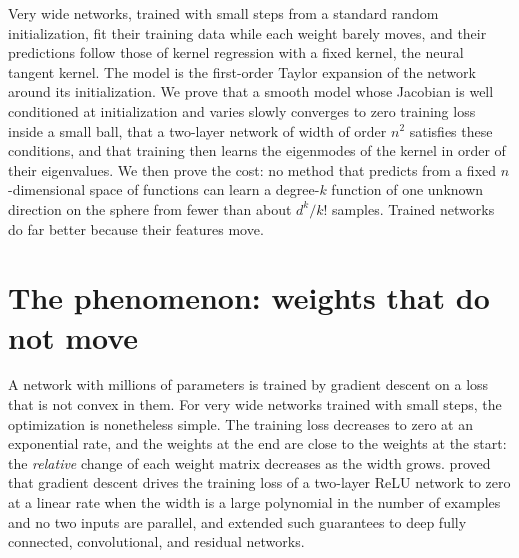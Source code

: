 \begin{refsection}

\begin{chaptersummary}
Very wide networks, trained with small steps from a standard random initialization, fit their training data while each weight barely moves, and their predictions follow those of kernel regression with a fixed kernel, the neural tangent kernel. The model is the first-order Taylor expansion of the network around its initialization. We prove that a smooth model whose Jacobian is well conditioned at initialization and varies slowly converges to zero training loss inside a small ball, that a two-layer network of width of order $n^2$ satisfies these conditions, and that training then learns the eigenmodes of the kernel in order of their eigenvalues. We then prove the cost: no method that predicts from a fixed $n$-dimensional space of functions can learn a degree-$k$ function of one unknown direction on the sphere from fewer than about $d^k/k!$ samples. Trained networks do far better because their features move.
\end{chaptersummary}

\section{The phenomenon: weights that do not move}\label{sec:lazy:phenomenon}

A network with millions of parameters is trained by gradient descent on a loss that is not convex in them. For very wide networks trained with small steps, the optimization is nonetheless simple. The training loss decreases to zero at an exponential rate, and the weights at the end are close to the weights at the start: the \emph{relative} change of each weight matrix decreases as the width grows. \Textcite{DuEtAl2019} proved that gradient descent drives the training loss of a two-layer ReLU network to zero at a linear rate when the width is a large polynomial in the number of examples and no two inputs are parallel, and \textcite{AllenZhuEtAl2019} extended such guarantees to deep fully connected, convolutional, and residual networks.


\end{refsection}
